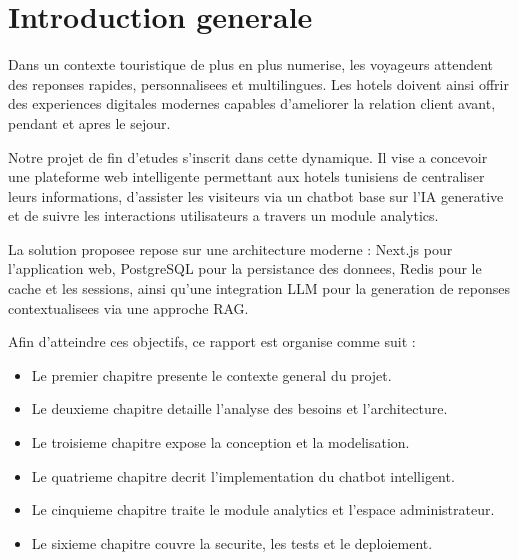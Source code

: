 \chapter*{Introduction generale}

Dans un contexte touristique de plus en plus numerise, les voyageurs attendent des reponses rapides, personnalisees et multilingues. Les hotels doivent ainsi offrir des experiences digitales modernes capables d'ameliorer la relation client avant, pendant et apres le sejour.

Notre projet de fin d'etudes s'inscrit dans cette dynamique. Il vise a concevoir une plateforme web intelligente permettant aux hotels tunisiens de centraliser leurs informations, d'assister les visiteurs via un chatbot base sur l'IA generative et de suivre les interactions utilisateurs a travers un module analytics.

La solution proposee repose sur une architecture moderne : Next.js pour l'application web, PostgreSQL pour la persistance des donnees, Redis pour le cache et les sessions, ainsi qu'une integration LLM pour la generation de reponses contextualisees via une approche RAG.

Afin d'atteindre ces objectifs, ce rapport est organise comme suit :
\begin{itemize}
  \item Le premier chapitre presente le contexte general du projet.
  \item Le deuxieme chapitre detaille l'analyse des besoins et l'architecture.
  \item Le troisieme chapitre expose la conception et la modelisation.
  \item Le quatrieme chapitre decrit l'implementation du chatbot intelligent.
  \item Le cinquieme chapitre traite le module analytics et l'espace administrateur.
  \item Le sixieme chapitre couvre la securite, les tests et le deploiement.
\end{itemize}
